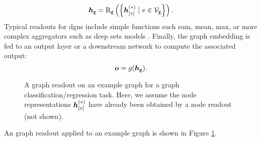 $$\GraphRepr{g} = \GraphReadout{g}\Par{\Set{\StateVector{v}{*} \mid v \in \Nodes{g}}}.$$
Typical readouts for \glspl{dgn} include simple functions such sum, mean, max, or more complex aggregators such as deep sets models \citep{zaheer2017deepsets}. Finally, the graph embedding is fed to an output layer or a downstream network to compute the associated output:
$$\Vector{o} = g(\GraphRepr{g}).$$
\begin{figure*}[h!]
    \centering
    \resizebox{.6\textwidth}{!}{}
    \caption{A graph readout on an example graph for a graph classification/regression task. Here, we assume the node representations $\StateVector{v}{*}$ have already been obtained by a node readout (not shown).}
    \label{fig:graph-readout}
\end{figure*}
An graph readout applied to an example graph is shown in Figure \ref{fig:graph-readout}.


